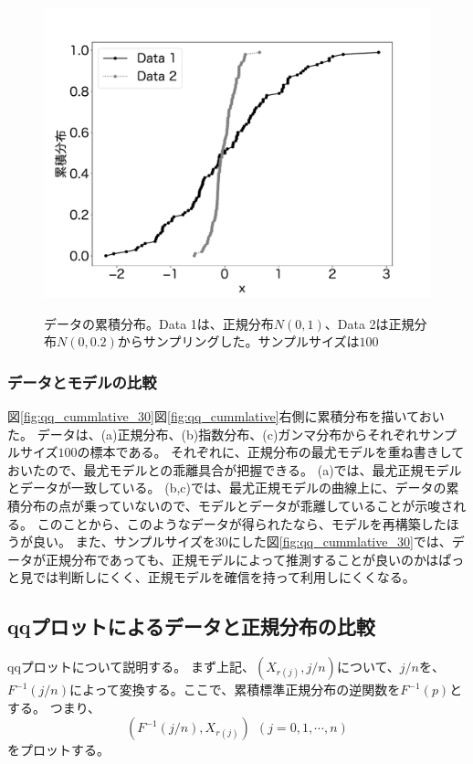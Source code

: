 \begin{figure}
 \begin{center}
  \includegraphics[width=15cm]{./image/12_/cummlative_data_example_norm.pdf}
  \label{fig:qq_ccummlative_data_example_normummlative}
  \caption{データの累積分布。Data 1は、正規分布$N(0,1)$、Data 2は正規分布$N(0,0.2)$からサンプリングした。サンプルサイズは$100$}
 \end{center}
\end{figure}


\subsubsection{データとモデルの比較}
図\ref{fig:qq_cummlative_30}図\ref{fig:qq_cummlative}右側に累積分布を描いておいた。
データは、(a)正規分布、(b)指数分布、(c)ガンマ分布からそれぞれサンプルサイズ$100$の標本である。
それぞれに、正規分布の最尤モデルを重ね書きしておいたので、最尤モデルとの乖離具合が把握できる。
(a)では、最尤正規モデルとデータが一致している。
(b,c)では、最尤正規モデルの曲線上に、データの累積分布の点が乗っていないので、モデルとデータが乖離していることが示唆される。
このことから、このようなデータが得られたなら、モデルを再構築したほうが良い。
また、サンプルサイズを30にした図\ref{fig:qq_cummlative_30}では、データが正規分布であっても、正規モデルによって推測することが良いのかはぱっと見では判断しにくく、正規モデルを確信を持って利用しにくくなる。

\subsection{qqプロットによるデータと正規分布の比較}
qqプロットについて説明する。
まず上記、$(X_{r(j)},j/n)$について、$j/n$を、$F^{-1}(j/n)$によって変換する。ここで、累積標準正規分布の逆関数を$F^{-1}(p)$とする。
つまり、
\begin{equation*}
(F^{-1}(j/n),X_{r(j)}) \ \ (j=0,1,\cdots,n)
\end{equation*}
をプロットする。



